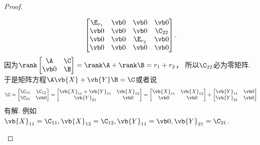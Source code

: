 \begin{example}
\begin{proof}
\begin{itemize}
\[\begin{bmatrix}
			\E_{r_1} & \vb0 & \vb0 & \vb0 \\
			\vb0 & \vb0 & \vb0 & \C_{22} \\
			\vb0 & \vb0 & \E_{r_2} & \vb0 \\
			\vb0 & \vb0 & \vb0 & \vb0
		\end{bmatrix}.
	\]
	因为\(\rank\begin{bmatrix}
		\A & \C \\
		\vb0 & \B
	\end{bmatrix}
	= \rank \A + \rank \B
	= r_1 + r_2\)，
	所以\(\C_{22}\)必为零矩阵.
	于是矩阵方程\(\A\vb{X}+\vb{Y}\B=\C\)或者说\[
		\C = \begin{bmatrix}
			\C_{11} & \C_{12} \\
			\C_{21} & \vb0
		\end{bmatrix}
		= \begin{bmatrix}
			\vb{X}_{11} + \vb{Y}_{11} & \vb{X}_{12} \\
			\vb{Y}_{21} & \vb0
		\end{bmatrix}
		= \begin{bmatrix}
			\vb{X}_{11} & \vb{X}_{12} \\
			\vb0 & \vb0
		\end{bmatrix}
		+ \begin{bmatrix}
			\vb{Y}_{11} & \vb0 \\
			\vb{Y}_{21} & \vb0
		\end{bmatrix}
	\]有解.
	例如\(\vb{X}_{11} = \C_{11}, \vb{X}_{12} = \C_{12}, \vb{Y}_{11} = \vb0, \vb{Y}_{21} = \C_{21}\).
	\qedhere
\end{itemize}
\end{proof}
\end{example}
